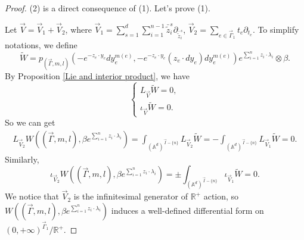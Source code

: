 \documentclass[11pt]{amsart}
\theoremstyle{definition}
\theoremstyle{remark}
\numberwithin{equation}{section}
\begin{document}
\begin{proof}
    (2) is a direct consequence of (1). Let's prove (1).

    Let $\vec{V}=\vec{V}_{1}+\vec{V}_{2}$, where $\vec{V}_{1}=\sum_{s=1}^{d}\sum_{i=1}^{n-1}\bar{\tilde{z}}_{i}^{s}\partial_{\bar{\tilde{z}}_{i}^{s}}$, $\vec{V}_{2}=\sum_{e\in\vec{\Gamma}_{1}}t_{e}\partial_{t_{e}}$. To simplify notations, we define
    $$
    \tilde{W}=p_{(\vec{\Gamma},m,l)}(-e^{-z_{e}\cdot y_{e}}dy_{e}^{m(e)},-e^{-z_{e}\cdot y_{e}}(z_{e}\cdot dy_{e})dy_{e}^{m(e)})e^{\sum_{i=1}^{n}z_{i}\cdot\lambda_{i}}\otimes \beta.
    $$
    By Proposition \ref{Lie and interior product}, we have
    $$
    \begin{cases}
        L_{\vec{V}}\tilde{W}=0,\\
        \iota_{\vec{V}}\tilde{W}=0.
    \end{cases}
    $$
    So we can get 
    \begin{align*}
        L_{\vec{V}_{2}}W((\vec{\Gamma},m,l),\beta e^{\sum_{i=1}^{n}z_{i}\cdot\lambda_{i}})=\int_{(\mathbb{A}^{d})^{\vec{I}-\{n\}}}L_{\vec{V}_{2}}\tilde{W}=-\int_{(\mathbb{A}^{d})^{\vec{I}-\{n\}}}L_{\vec{V}_{1}}\tilde{W}=0.
    \end{align*}
    Similarly,
    $$
    \iota_{\vec{V}_{2}}W((\vec{\Gamma},m,l),\beta e^{\sum_{i=1}^{n}z_{i}\cdot\lambda_{i}})=\pm\int_{(\mathbb{A}^{d})^{\vec{I}-\{n\}}}\iota_{\vec{V}_{1}}\tilde{W}=0.
    $$
    We notice that $\vec{V}_{2}$ is the infinitesimal generator of $\mathbb{R}^{+}$ action, so $W((\vec{\Gamma},m,l),\beta e^{\sum_{i=1}^{n}z_{i}\cdot\lambda_{i}})$ induces a well-defined differential form on $(0,+\infty)^{\vec{\Gamma}_{1}}/\mathbb{R}^{+}$.
\end{proof}
\end{document}
